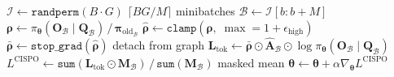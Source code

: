 \documentclass[11pt]{article}
\begin{document}
\begin{algorithm}[p]
\begin{minipage}[t]{0.68\linewidth}
\begin{algorithmic}[1]
        \State $\mathcal{I} \gets \texttt{randperm}(B \!\cdot\! G)$
         \hfill $\lceil BG/M \rceil$ minibatches
            \State $\mathcal{B} \gets \mathcal{I}[b : b{+}M]$
            \State $\boldsymbol{\rho} \gets \pi_{\boldsymbol{\theta}}(\mathbf{O}_\mathcal{B} \mid \mathbf{Q}_\mathcal{B}) \,/\, \boldsymbol{\pi}_{\text{old}_\mathcal{B}}$
            \State $\hat{\boldsymbol{\rho}} \gets \texttt{clamp}(\boldsymbol{\rho},\; \max = 1 + \epsilon_{\text{high}})$
            \State $\bar{\boldsymbol{\rho}} \gets \texttt{stop\_grad}(\hat{\boldsymbol{\rho}})$ \hfill detach from graph
            \State $\mathbf{L}_{\text{tok}} \gets \bar{\boldsymbol{\rho}} \odot \hat{\mathbf{A}}_\mathcal{B} \odot \log \pi_{\boldsymbol{\theta}}(\mathbf{O}_\mathcal{B} \mid \mathbf{Q}_\mathcal{B})$
            \State $L^{\text{CISPO}} \gets \texttt{sum}(\mathbf{L}_{\text{tok}} \odot \mathbf{M}_\mathcal{B}) \,/\, \texttt{sum}(\mathbf{M}_\mathcal{B})$ \hfill masked mean
            \State $\boldsymbol{\theta} \gets \boldsymbol{\theta} + \alpha \nabla_{\boldsymbol{\theta}} L^{\text{CISPO}}$
        \EndFor
    \EndFor
\EndFor
\end{algorithmic}
\end{minipage}
\end{algorithm}
\end{document}
